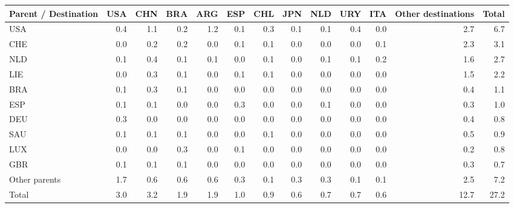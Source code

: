 \begin{tabular}{lrrrrrrrrrrrr}
\toprule
Parent / Destination & USA & CHN & BRA & ARG & ESP & CHL & JPN & NLD & URY & ITA & Other destinations & Total \\
\midrule
USA & 0.4 & 1.1 & 0.2 & 1.2 & 0.1 & 0.3 & 0.1 & 0.1 & 0.4 & 0.0 & 2.7 & 6.7 \\
CHE & 0.0 & 0.2 & 0.2 & 0.0 & 0.1 & 0.1 & 0.0 & 0.0 & 0.0 & 0.1 & 2.3 & 3.1 \\
NLD & 0.1 & 0.4 & 0.1 & 0.1 & 0.0 & 0.1 & 0.0 & 0.1 & 0.1 & 0.2 & 1.6 & 2.7 \\
LIE & 0.0 & 0.3 & 0.1 & 0.0 & 0.1 & 0.1 & 0.0 & 0.0 & 0.0 & 0.0 & 1.5 & 2.2 \\
BRA & 0.1 & 0.3 & 0.1 & 0.0 & 0.0 & 0.0 & 0.0 & 0.0 & 0.0 & 0.0 & 0.4 & 1.1 \\
ESP & 0.1 & 0.1 & 0.0 & 0.0 & 0.3 & 0.0 & 0.0 & 0.1 & 0.0 & 0.0 & 0.3 & 1.0 \\
DEU & 0.3 & 0.0 & 0.0 & 0.0 & 0.0 & 0.0 & 0.0 & 0.0 & 0.0 & 0.0 & 0.4 & 0.8 \\
SAU & 0.1 & 0.1 & 0.1 & 0.0 & 0.0 & 0.1 & 0.0 & 0.0 & 0.0 & 0.0 & 0.5 & 0.9 \\
LUX & 0.0 & 0.0 & 0.3 & 0.0 & 0.1 & 0.0 & 0.0 & 0.0 & 0.0 & 0.0 & 0.2 & 0.8 \\
GBR & 0.1 & 0.1 & 0.1 & 0.0 & 0.0 & 0.0 & 0.0 & 0.0 & 0.0 & 0.0 & 0.3 & 0.7 \\
Other parents & 1.7 & 0.6 & 0.6 & 0.6 & 0.3 & 0.1 & 0.3 & 0.3 & 0.1 & 0.1 & 2.5 & 7.2 \\
\midrule
Total & 3.0 & 3.2 & 1.9 & 1.9 & 1.0 & 0.9 & 0.6 & 0.7 & 0.7 & 0.6 & 12.7 & 27.2 \\
\bottomrule
\end{tabular}
